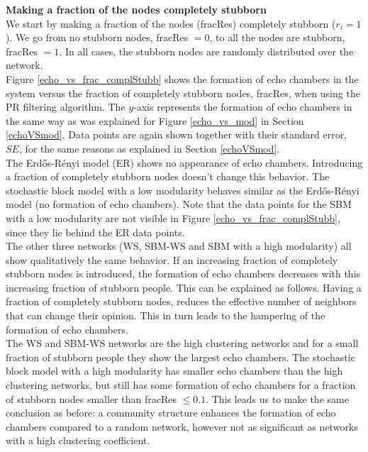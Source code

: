 \documentclass[11 pt , letterpaper , twoside , openright]{book}
\begin{document}
\newpage
\noindent
\textbf{Making a fraction of the nodes completely stubborn}\\
\newline
We start by making a fraction of the nodes (fracRes) completely stubborn ($r_i = 1$). We go from no stubborn nodes, fracRes $=0$, to all the nodes are stubborn, fracRes $=1$. In all cases, the stubborn nodes are randomly distributed over the network.\\
\newline
Figure \ref{echo_vs_frac_complStubb} shows the formation of echo chambers in the system versus the fraction of completely stubborn nodes, fracRes, when using the PR filtering algorithm. The $y$-axis represents the formation of echo chambers in the same way as was explained for Figure \ref{echo_vs_mod} in Section \ref{echoVSmod}. Data points are again shown together with their standard error, $SE$, for the same reasons as explained in Section \ref{echoVSmod}.\\
The Erd\H{o}s-R\'{e}nyi model (ER) shows no appearance of echo chambers. Introducing a fraction of completely stubborn nodes doesn't change this behavior. The stochastic block model with a low modularity behaves similar as the Erd\H{o}s-R\'{e}nyi model (no formation of echo chambers). Note that the data points for the SBM with a low modularity are not visible in Figure \ref{echo_vs_frac_complStubb}, since they lie behind the ER data points.\\
The other three networks (WS, SBM-WS and SBM with a high modularity) all show qualitatively the same behavior. If an increasing fraction of completely stubborn nodes is introduced, the formation of echo chambers decreases with this increasing fraction of stubborn people. This can be explained as follows. Having a fraction of completely stubborn nodes, reduces the effective number of neighbors that can change their opinion. This in turn leads to the hampering of the formation of echo chambers.\\
The WS and SBM-WS networks are the high clustering networks and for a small fraction of stubborn people they show the largest echo chambers. The stochastic block model with a high modularity has smaller echo chambers than the high clustering networks, but still has some formation of echo chambers for a fraction of stubborn nodes smaller than fracRes $\leqslant 0.1$. This leads us to make the same conclusion as before: a community structure enhances the formation of echo chambers compared to a random network, however not as significant as networks with a high clustering coefficient. 
\end{document}
